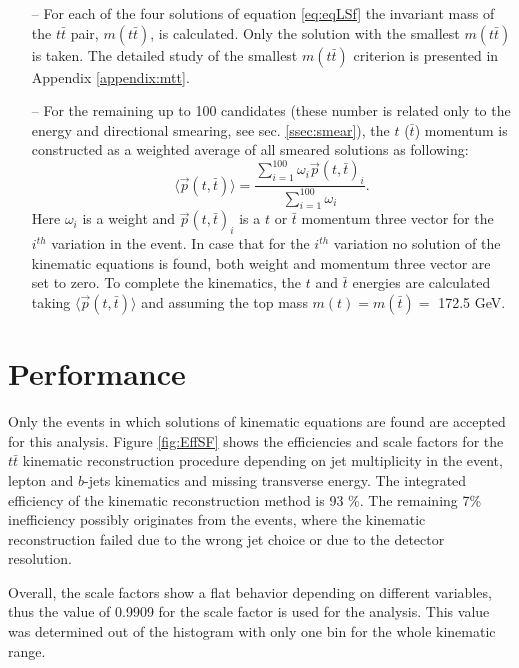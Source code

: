 \begin{itemize}
 \item [--] For each of the four solutions of equation \ref{eq:eqLSf} the invariant mass of the $t\bar{t}$ pair, $m(t\bar{t})$, is calculated. Only
 the solution with the smallest $m(t\bar{t})$ is taken. The detailed study of the smallest $m(t\bar{t})$ criterion is presented in Appendix \ref{appendix:mtt}. 
 \item [--] For the remaining up to 100 candidates (these number is related only to the energy and directional smearing, see sec. \ref{ssec:smear}), the $t$ ($\bar{t}$) 
 momentum is constructed as a weighted average of all smeared solutions as following:
 \begin{equation}
  \langle{\vec{p}(t,\bar{t})}\rangle = \frac{\sum\limits_{i=1}^{100} \omega_{i} \vec{p}(t,\bar{t})_i}{\sum\limits_{i=1}^{100} \omega_i}.
 \end{equation}
 Here $\omega_i$ is a weight and $\vec{p}(t, \bar{t})_{i}$ is a $t$ or $\bar{t}$ momentum three vector for the $i^{th}$ variation in the event. 
 In case that for the $i^{th}$ variation no solution of the kinematic equations is found, both weight and momentum three vector are set to zero. To complete the kinematics,
 the $t$ and $\bar{t}$ energies are calculated taking $\langle{\vec{p}(t,\bar{t})}\rangle$ and assuming the top mass $m(t) = m(\bar{t}) = $ 172.5 GeV.
\end{itemize}

\section{Performance}\label{sec:kinRecPerf}

Only the events in which solutions of kinematic equations are found are accepted for this analysis. 
Figure \ref{fig:EffSF} shows the efficiencies and scale factors for the $t\bar{t}$ kinematic reconstruction procedure depending on jet multiplicity in the event, 
lepton and $b$-jets kinematics and missing transverse energy. The integrated efficiency of the kinematic reconstruction method is 93 $\%$. The remaining 7\%
inefficiency possibly originates from the events, where the kinematic reconstruction failed due to the wrong jet choice or due to the detector resolution.

Overall, the scale factors 
show a flat behavior depending on different variables, thus the value of 0.9909 for the scale factor is used for the analysis. This value was determined 
out of the histogram with only one bin for the whole kinematic range.

